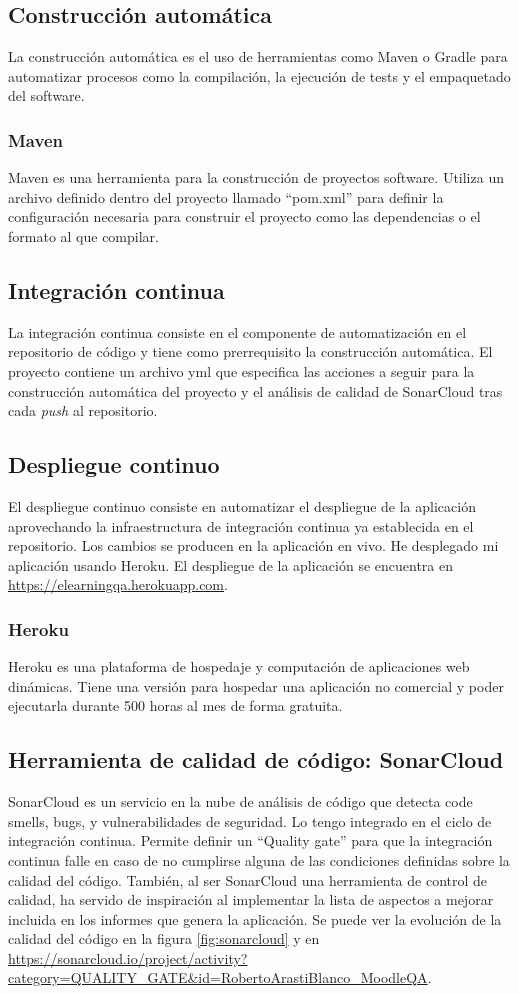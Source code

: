 \subsection{Construcción automática}
La construcción automática es el uso de herramientas como Maven o Gradle para automatizar procesos como la compilación, la ejecución de tests y el empaquetado del software.
\subsubsection{Maven}
Maven es una herramienta para la construcción de proyectos software. Utiliza un archivo definido dentro del proyecto llamado ``pom.xml'' para definir la configuración necesaria para construir el proyecto como las dependencias o el formato al que compilar.
\subsection{Integración continua}
La integración continua consiste en el componente de automatización en el repositorio de código y tiene como prerrequisito la construcción automática.
El proyecto contiene un archivo yml que especifica las acciones a seguir para la construcción automática del proyecto y el análisis de calidad de SonarCloud tras cada \textit{push} al repositorio.
\subsection{Despliegue continuo}
El despliegue continuo consiste en automatizar el despliegue de la aplicación aprovechando la infraestructura de integración continua ya establecida en el repositorio. Los cambios se producen en la aplicación en vivo. He desplegado mi aplicación usando Heroku. El despliegue de la aplicación se encuentra en \url{https://elearningqa.herokuapp.com}.
\subsubsection{Heroku}
Heroku es una plataforma de hospedaje y computación de aplicaciones web dinámicas. Tiene una versión para hospedar una aplicación no comercial y poder ejecutarla durante 500 horas al mes de forma gratuita.

\subsection{Herramienta de calidad de código: SonarCloud}
SonarCloud es un servicio en la nube de análisis de código que detecta code smells, bugs, y vulnerabilidades de seguridad. Lo tengo integrado en el ciclo de integración continua. Permite definir un ``Quality gate'' para que la integración continua falle en caso de no cumplirse alguna de las condiciones definidas sobre la calidad del código.
También, al ser SonarCloud una herramienta de control de calidad, ha servido de inspiración al implementar la lista de aspectos a mejorar incluida en los informes que genera la aplicación.
Se puede ver la evolución de la calidad del código en la figura \ref{fig:sonarcloud} y en \url{https://sonarcloud.io/project/activity?category=QUALITY_GATE&id=RobertoArastiBlanco_MoodleQA}.


